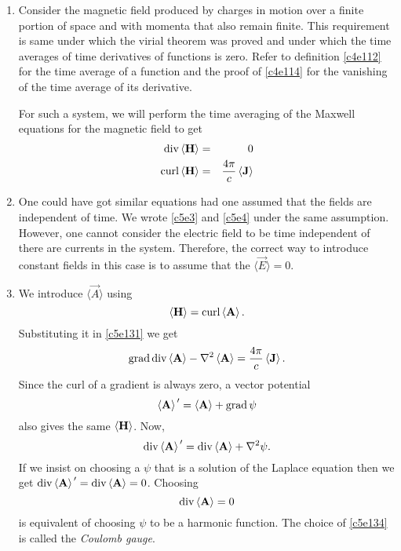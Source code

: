 \begin{enumerate}
\item Consider the magnetic field produced by charges in motion over a finite
portion of space and with momenta that also remain finite. This requirement is 
same under which the virial theorem was proved and under which the time averages
of time derivatives of functions is zero. Refer to definition \eqref{c4e112} 
for the time average of a function and the proof of \eqref{c4e114} for the 
vanishing of the time average of its derivative.

For such a system, we will perform the time averaging of the Maxwell equations
for the magnetic field to get
\begin{eqnarray}
\operatorname{div}\left\langle{\mathbf{H}}\right\rangle &=& 0 \label{c5e130} \\
\operatorname{curl}\left\langle{\mathbf{H}}\right\rangle &=& \frac{4\pi}{c}\left\langle{\mathbf{J}}\right\rangle \label{c5e131}
\end{eqnarray}

\item One could have got similar equations had one assumed that the fields are
independent of time. We wrote \eqref{c5e3} and \eqref{c5e4} under the same 
assumption. However, one cannot consider the electric field to be time independent
of there are currents in the system. Therefore, the correct way to introduce
constant fields in this case is to assume that the $\langle\vec{E}\rangle = 0$.

\item We introduce $\langle\vec{A}\rangle$ using
\begin{equation}\label{c5e132}
\left\langle{\mathbf{H}}\right\rangle = \operatorname{curl}\left\langle{\mathbf{A}}\right\rangle.
\end{equation}
Substituting it in \eqref{c5e131} we get
\begin{equation}\label{c5e133}
\operatorname{grad}\operatorname{div}\left\langle{\mathbf{A}}\right\rangle - \nabla^2\left\langle{\mathbf{A}}\right\rangle = \frac{4\pi}{c}\left\langle{\mathbf{J}}\right\rangle.
\end{equation}
Since the curl of a gradient is always zero, a vector potential
\[
\left\langle{\mathbf{A}}\right\rangle^{\,\prime} = \left\langle{\mathbf{A}}\right\rangle + \operatorname{grad}\psi
\]
also gives the same $\left\langle{\mathbf{H}}\right\rangle$. Now,
\[
\operatorname{div}\left\langle{\mathbf{A}}\right\rangle^{\,\prime} = \operatorname{div}\left\langle{\mathbf{A}}\right\rangle + \nabla^2\psi.
\]
If we insist on choosing a $\psi$ that is a solution of the Laplace equation then
we get $\operatorname{div}\left\langle{\mathbf{A}}\right\rangle^{\,\prime} = \operatorname{div}\left\langle{\mathbf{A}}\right\rangle = 0$. Choosing
\begin{equation}\label{c5e134}
\operatorname{div}\left\langle{\mathbf{A}}\right\rangle = 0
\end{equation} is equivalent of choosing $\psi$ to be a harmonic function. The 
choice of \eqref{c5e134} is called the \emph{Coulomb gauge}.


\end{enumerate}
